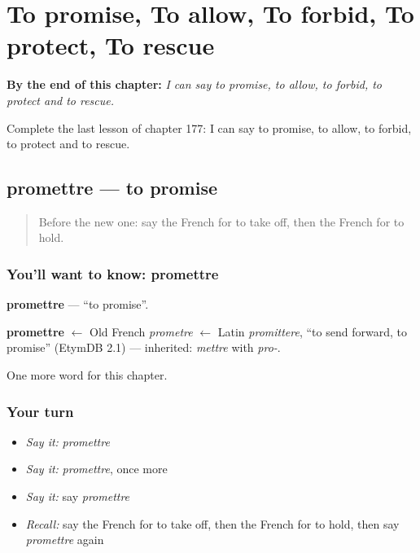 
\chapter{To promise, To allow, To forbid, To protect, To rescue}
\label{ch:fr-to-promise-to-allow-to-forbid-to-protect-to-rescue}

\begin{chapteropening}
\textbf{By the end of this chapter:} \emph{I can say to promise, to allow, to forbid, to protect and to rescue.}

Complete the last lesson of chapter 177: I can say to promise, to allow, to forbid, to protect and to rescue.
\end{chapteropening}

\section[promettre]{promettre — to promise}

\label{lesson:FR-C177-promettre}



\begin{quote}
Before the new one: say the French for to take off, then the French for to hold.
\end{quote}

\subsection*{You'll want to know: promettre}
\textbf{promettre} — \textquotedblleft{}to promise\textquotedblright{}.

\begin{cousinweb}
\textbf{promettre} $\leftarrow$ Old French \emph{prometre} $\leftarrow$ Latin \emph{promittere}, \textquotedblleft{}to send forward, to promise\textquotedblright{} (EtymDB 2.1) — inherited: \emph{mettre} with \emph{pro-}.
\end{cousinweb}

\begin{grammarlens}[title={What you've built}]
One more word for this chapter.
\end{grammarlens}

\subsection*{Your turn}
\begin{itemize}
\raggedright
  \item \emph{Say it:} \emph{promettre}
  \item \emph{Say it:} \emph{promettre}, once more
  \item \emph{Say it:} say \emph{promettre}
  \item \emph{Recall:} say the French for to take off, then the French for to hold, then say \emph{promettre} again
\end{itemize}

